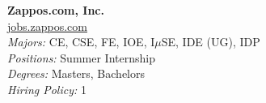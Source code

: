\documentclass{article}
\begin{document}
\begin{center}
\begin{multicols}{3}
\begin{minipage}{.9\columnwidth}{\Large\bf Zappos.com, Inc. }\\
	\url{jobs.zappos.com}\\
	\emph{Majors:} CE, CSE, FE, IOE, I$\mu$SE, IDE (UG), IDP\\
	\emph{Positions:} Summer Internship\\
	\emph{Degrees:} Masters, Bachelors\\
	\emph{Hiring Policy:} 1\\
\end{minipage}
 
\end{multicols}\end{center}
\end{document}
